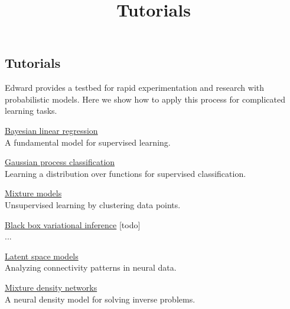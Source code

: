 \title{Tutorials}

\subsection{Tutorials}

Edward provides a testbed for rapid experimentation and research with
probabilistic models. Here we show how to apply this process for
complicated learning tasks.


\href{supervised-regression}{Bayesian linear regression} \\
A fundamental model for supervised learning.


\href{supervised-classification}{Gaussian process classification} \\
Learning a distribution over functions for supervised classification.

\href{unsupervised}{Mixture models} \\
Unsupervised learning by clustering data points.




\href{bbvi}{Black box variational inference} [todo] \\
...

\href{latent-space-models}{Latent space models} \\
Analyzing connectivity patterns in neural data.

\href{mixture-density-network}{Mixture density networks} \\
A neural density model for solving inverse problems.




